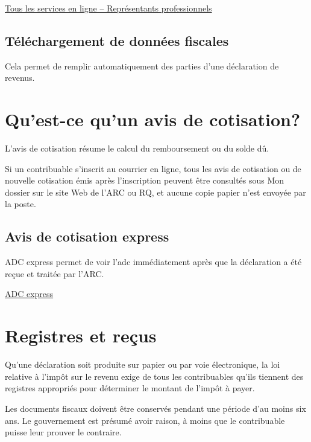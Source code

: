 \href{https://www.revenuquebec.ca/fr/services-en-ligne/services-en-ligne/services-en-ligne/representants-professionnels/}{Tous les services en ligne – Représentants professionnels}


\subsection{Téléchargement de données fiscales}
Cela permet de remplir automatiquement des parties d'une déclaration de revenus.



\section{Qu'est-ce qu'un avis de cotisation?}
\begin{intro}
	L'avis de cotisation résume le calcul du remboursement ou du solde dû.
\end{intro}
\begin{note}
	Si un contribuable s'inscrit au courrier en ligne, tous les avis de cotisation ou de nouvelle cotisation émis après l'inscription peuvent être consultés sous Mon dossier sur le site Web de l'ARC ou RQ, et aucune copie papier n'est envoyée par la poste.
\end{note}


\subsection{Avis de cotisation express}
ADC express permet de voir l'\acrfull{adc} immédiatement après que la déclaration a été reçue et traitée par l'ARC.

\href{https://www.canada.ca/fr/agence-revenu/services/services-electroniques/a-propos-express.html}{ADC express}



\section{Registres et reçus}
\begin{intro}
	Qu'une déclaration soit produite sur papier ou par voie électronique, la loi relative à l'impôt sur le revenu exige de tous les contribuables qu'ils tiennent des registres appropriés pour déterminer le montant de l'impôt à payer.
\end{intro}
Les documents fiscaux doivent être conservés pendant une période d'au moins six ans. Le gouvernement \cat \qct est présumé avoir raison, à moins que le contribuable puisse leur prouver le contraire.


